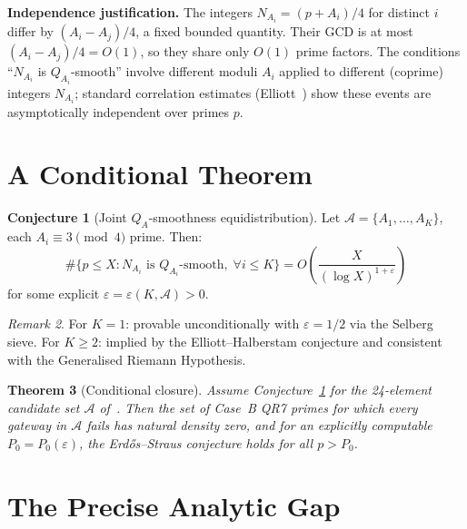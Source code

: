 \documentclass[12pt]{amsart}
\newtheorem{theorem}{Theorem}[section]
\theoremstyle{definition}
\newtheorem{conjecture}[theorem]{Conjecture}
\theoremstyle{remark}
\newtheorem{remark}[theorem]{Remark}
\begin{document}
\textbf{Independence justification.}
The integers $N_{A_i} = (p + A_i)/4$ for distinct $i$ differ by $(A_i - A_j)/4$,
a fixed bounded quantity.  Their GCD is at most $(A_i - A_j)/4 = O(1)$,
so they share only $O(1)$ prime factors.
The conditions ``$N_{A_i}$ is $Q_{A_i}$-smooth'' involve different moduli $A_i$
applied to different (coprime) integers $N_{A_i}$;
standard correlation estimates (Elliott~\cite{Elliott1980})
show these events are asymptotically independent over primes $p$.

\section{A Conditional Theorem}\label{sec:conditional}

\begin{conjecture}[Joint $Q_A$-smoothness equidistribution]\label{conj:equidist}
Let $\mathcal{A} = \{A_1, \ldots, A_K\}$, each $A_i \equiv 3 \pmod{4}$ prime.
Then:
\[
  \#\bigl\{p \le X : N_{A_i} \text{ is } Q_{A_i}\text{-smooth},\; \forall i \le K\bigr\}
  = O\!\left(\frac{X}{(\log X)^{1 + \varepsilon}}\right)
\]
for some explicit $\varepsilon = \varepsilon(K, \mathcal{A}) > 0$.
\end{conjecture}

\begin{remark}
For $K = 1$: provable unconditionally with $\varepsilon = 1/2$ via the Selberg sieve.
For $K \ge 2$: implied by the Elliott--Halberstam conjecture
and consistent with the Generalised Riemann Hypothesis.
\end{remark}

\begin{theorem}[Conditional closure]\label{thm:conditional}
Assume Conjecture~\ref{conj:equidist} for the 24-element candidate set
$\mathcal{A}$ of~\cite{Gateway2026}.
Then the set of Case~B QR7 primes for which every gateway in $\mathcal{A}$ fails
has natural density zero, and for an explicitly computable $P_0 = P_0(\varepsilon)$,
the Erd\H{o}s--Straus conjecture holds for all $p > P_0$.
\end{theorem}

\section{The Precise Analytic Gap}\label{sec:gap}
\end{document}
